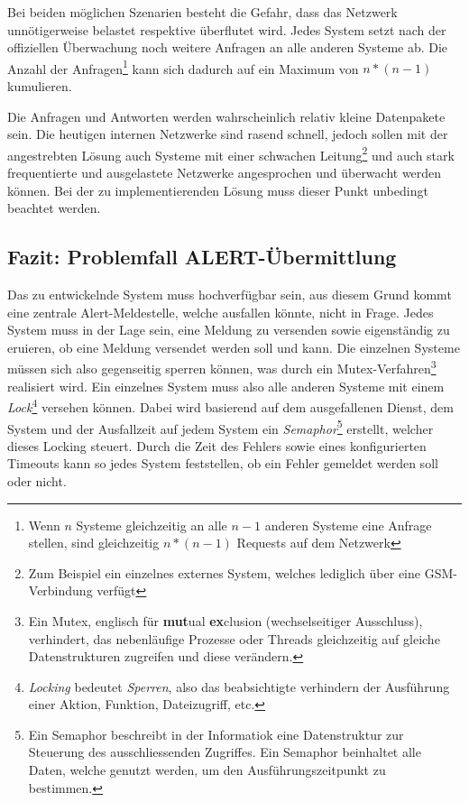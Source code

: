 Bei beiden m\"oglichen Szenarien besteht die Gefahr, dass das Netzwerk unn\"otigerweise belastet respektive \"uberflutet wird. Jedes System setzt nach der offiziellen \"Uberwachung noch weitere Anfragen an alle anderen Systeme ab. Die Anzahl der Anfragen\footnote{Wenn $n$ Systeme gleichzeitig an alle $n-1$ anderen Systeme eine Anfrage stellen, sind gleichzeitig $n*(n-1)$ Requests auf dem Netzwerk} kann sich dadurch auf ein Maximum von $n*(n-1)$ kumulieren.

Die Anfragen und Antworten werden wahrscheinlich relativ kleine Datenpakete sein. Die heutigen internen Netzwerke sind rasend schnell, jedoch sollen mit der angestrebten L\"osung auch Systeme mit einer schwachen Leitung\footnote{Zum Beispiel ein einzelnes externes System, welches lediglich \"uber eine GSM-Verbindung verf\"ugt} und auch stark frequentierte und ausgelastete Netzwerke angesprochen und \"uberwacht werden k\"onnen. Bei der zu implementierenden L\"osung muss dieser Punkt unbedingt beachtet werden.

\subsection{Fazit: Problemfall ALERT-\"Ubermittlung} \label{sec:theorie-alert-fazit}
Das zu entwickelnde System muss hochverf\"ugbar sein, aus diesem Grund kommt eine zentrale Alert-Meldestelle, welche ausfallen k\"onnte, nicht in Frage. Jedes System muss in der Lage sein, eine Meldung zu versenden sowie eigenst\"andig zu eruieren, ob eine Meldung versendet werden soll und kann. Die einzelnen Systeme m\"ussen sich also gegenseitig sperren k\"onnen, was durch ein Mutex-Verfahren\footnote{Ein Mutex, englisch f\"ur \textbf{mut}ual \textbf{ex}clusion (wechselseitiger Ausschluss), verhindert, das nebenl\"aufige Prozesse oder Threads gleichzeitig auf gleiche Datenstrukturen zugreifen und diese ver\"andern.} realisiert wird. Ein einzelnes System muss also alle anderen Systeme mit einem \textit{Lock}\footnote{\textit{Locking} bedeutet \textit{Sperren}, also das beabsichtigte verhindern der Ausf\"uhrung einer Aktion, Funktion, Dateizugriff, etc.} versehen k\"onnen. Dabei wird basierend auf dem ausgefallenen Dienst, dem System und der Ausfallzeit auf jedem System ein \textit{Semaphor}\footnote{Ein Semaphor beschreibt in der Informatiok eine Datenstruktur zur Steuerung des ausschliessenden Zugriffes. Ein Semaphor beinhaltet alle Daten, welche genutzt werden, um den Ausf\"uhrungszeitpunkt zu bestimmen.} erstellt, welcher dieses Locking steuert. Durch die Zeit des Fehlers sowie eines konfigurierten Timeouts kann so jedes System feststellen, ob ein Fehler gemeldet werden soll oder nicht.

